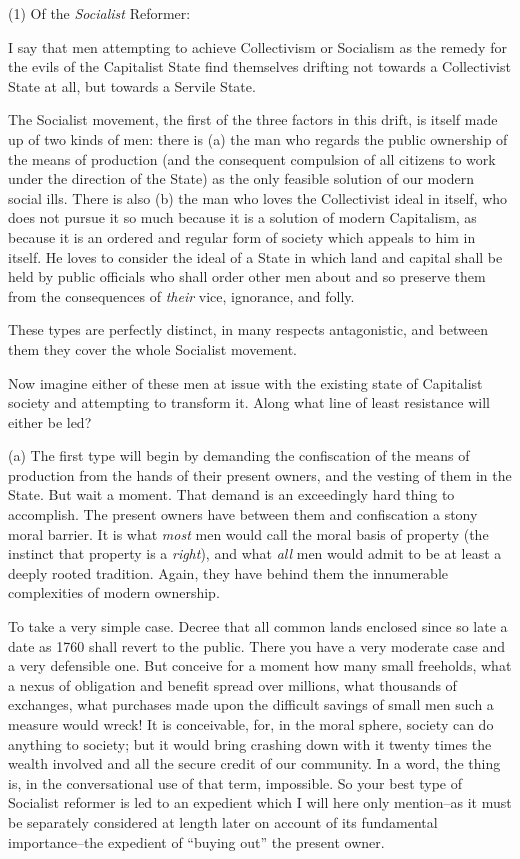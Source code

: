\documentclass{book}
\begin{document}
(1) Of the \emph{Socialist} Reformer:

I say that men attempting to achieve Collectivism or Socialism as the remedy for the evils of the Capitalist State find themselves drifting not towards a Collectivist State at all, but towards a Servile State.

The Socialist movement, the first of the three factors in this drift, is itself made up of two kinds of men: there is (a) the man who regards the public ownership of the means of production (and the consequent compulsion of all citizens to work under the direction of the State) as the only feasible solution of our modern social ills. There is also (b) the man who loves the Collectivist ideal in itself, who does not pursue it so much because it is a solution of modern Capitalism, as because it is an ordered and regular form of society which appeals to him in itself. He loves to consider the ideal of a State in which land and capital shall be held by public officials who shall order other men about and so preserve them from the consequences of \emph{their} vice, ignorance, and folly.

These types are perfectly distinct, in many respects antagonistic, and between them they cover the whole Socialist movement.

Now imagine either of these men at issue with the existing state of Capitalist society and attempting to transform it. Along what line of least resistance will either be led?

(a) The first type will begin by demanding the confiscation of the means of production from the hands of their present owners, and the vesting of them in the State. But wait a moment. That demand is an exceedingly hard thing to accomplish. The present owners have between them and confiscation a stony moral barrier. It is what \emph{most} men would call the moral basis of property (the instinct that property is a \emph{right}), and what \emph{all} men would admit to be at least a deeply rooted tradition. Again, they have behind them the innumerable complexities of modern ownership.

To take a very simple case. Decree that all common lands enclosed since so late a date as 1760 shall revert to the public. There you have a very moderate case and a very defensible one. But conceive for a moment how many small freeholds, what a nexus of obligation and benefit spread over millions, what thousands of exchanges, what purchases made upon the difficult savings of small men such a measure would wreck! It is conceivable, for, in the moral sphere, society can do anything to society; but it would bring crashing down with it twenty times the wealth involved and all the secure credit of our community. In a word, the thing is, in the conversational use of that term, impossible. So your best type of Socialist reformer is led to an expedient which I will here only mention–as it must be separately considered at length later on account of its fundamental importance–the expedient of “buying out” the present owner.
\end{document}
